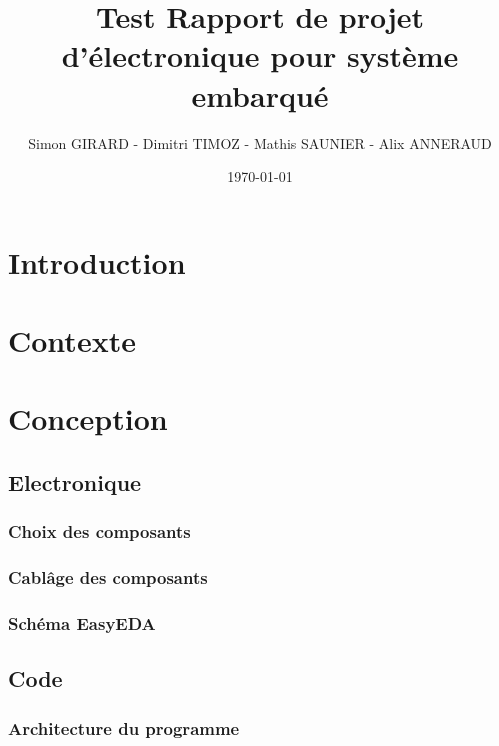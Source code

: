 \documentclass[a4paper, 12pt]{report}
\title{Test Rapport de projet d'électronique pour système embarqué}
\author{Simon GIRARD - Dimitri TIMOZ - Mathis SAUNIER - Alix ANNERAUD}
\date{\today}
\begin{document}
\begin{titlepage}
\maketitle{}
\end{titlepage}

\tableofcontents

\chapter{Introduction}
\lipsum[1-2]
% 
\chapter{Contexte}
\lipsum[3-4]

\chapter{Conception}

\section{Electronique}
\subsection{Choix des composants}
\subsection{Cablâge des composants}
\subsection{Schéma EasyEDA}
\section{Code}
\subsection{Architecture du programme}
\end{document}
